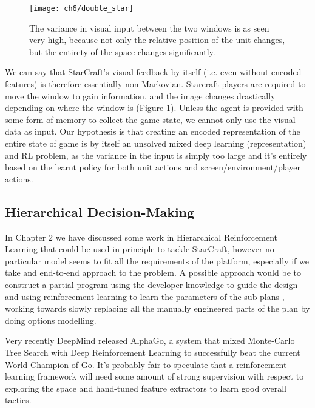\begin{figure}[h]
    \centering
    \texttt{[image: ch6/double\_star]}
    \caption{The variance in visual input between the two windows is as seen
      very high, because not only the relative position of the unit changes, but
      the entirety of the space changes significantly.}
    \label{fig:double_star}
\end{figure}

We can say that StarCraft’s visual feedback by itself (i.e. even without encoded
features) is therefore essentially non-Markovian. Starcraft players are required
to move the window to gain information, and the image changes drastically
depending on where the window is (Figure \ref{fig:double_star}). Unless the
agent is provided with some form of memory to collect the game state, we cannot
only use the visual data as input. Our hypothesis is that creating an encoded
representation of the entire state of game is by itself an unsolved mixed deep
learning (representation) and RL problem, as the variance in the input is simply
too large and it's entirely based on the learnt policy for both unit actions and
screen/environment/player actions.

\subsection{Hierarchical Decision-Making}

In Chapter 2 we have discussed some work in Hierarchical Reinforcement Learning
that could be used in principle to tackle StarCraft, however no particular model
seems to fit all the requirements of the platform, especially if we take and
end-to-end approach to the problem. A possible approach would be to construct a
partial program using the developer knowledge to guide the design and using
reinforcement learning to learn the parameters of the sub-plans
\citep{marthi2005concurrent}, working towards slowly replacing all the manually
engineered parts of the plan by doing options modelling.

Very recently DeepMind released AlphaGo, a system that mixed Monte-Carlo Tree
Search with Deep Reinforcement Learning \citep{silver2016mastering} to
successfully beat the current World Champion of Go. It's probably fair to
speculate that a reinforcement learning framework will need some amount of
strong supervision with respect to exploring the space and hand-tuned feature
extractors to learn good overall tactics.


